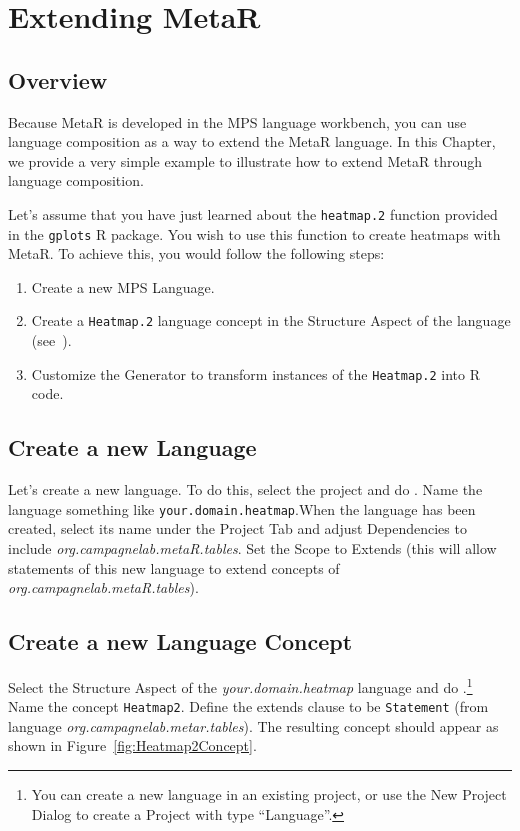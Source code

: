 


\chapter{Extending MetaR}\label{chap:ExtendingMetaR}

\section{Overview}
Because MetaR is developed in the MPS language workbench, you can use language composition as a way to extend the MetaR language. In this Chapter, we provide a very simple example to illustrate how to extend MetaR through language composition. 

Let's assume that you have just learned about the \texttt{heatmap.2} function provided in the \texttt{gplots} R package. You wish to use this function to create heatmaps with MetaR. To achieve this, you would follow the following steps: 
\begin{enumerate}
\item Create a new MPS Language.
  \item Create a \texttt{Heatmap.2} language concept in the Structure Aspect of the language (see~\cite{campagne2014mps}).
  \item Customize the Generator to transform instances of the \texttt{Heatmap.2} into R code.
\end{enumerate}

\section{Create a new Language}
Let's create a new language. To do this, select the project and do . Name the language something like \texttt{your.domain.\allowbreak{}heatmap}.When the language has been created, select its name under the Project Tab and adjust Dependencies to include \textit{org.campagnelab.metaR.tables}. Set the Scope to Extends (this will allow statements of this new language to extend concepts of \textit{org.campagnelab.metaR.tables}). 

\section{Create a new Language Concept}
Select the Structure Aspect of the \textit{your.domain.\allowbreak{}heatmap} language and do .\footnote{You can create a new language in an existing project, or use the New Project Dialog to create a Project with type ``Language''.} Name the concept \texttt{Heatmap2}. Define the extends clause to be \texttt{Statement} (from language \textit{org.campagnelab.metar.tables}). The resulting concept should appear as shown in Figure~\ref{fig:Heatmap2Concept}.

